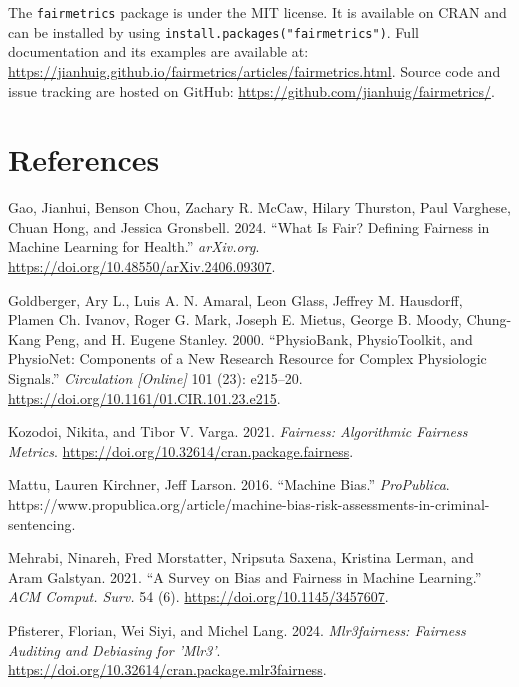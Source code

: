 \documentclass[10pt,a4paper,onecolumn]{article}
\newlength{\cslhangindent}
\newenvironment{CSLReferences}[2] %
 {\begin{list}{}{%
  \setlength{\itemindent}{0pt}
  \setlength{\leftmargin}{0pt}
  \setlength{\parsep}{0pt}
  \ifodd #1
   \setlength{\leftmargin}{\cslhangindent}
   \setlength{\itemindent}{-1\cslhangindent}
  \fi
  \setlength{\itemsep}{#2\baselineskip}}}
 {\end{list}}
\begin{document}
The \texttt{fairmetrics} package is under the MIT license. It is
available on CRAN and can be installed by using
\texttt{install.packages("fairmetrics")}. Full documentation and its
examples are available at:
\url{https://jianhuig.github.io/fairmetrics/articles/fairmetrics.html}.
Source code and issue tracking are hosted on GitHub:
\url{https://github.com/jianhuig/fairmetrics/}.

\section*{References}\label{references}

\label{refs}
\begin{CSLReferences}{1}{0}
Gao, Jianhui, Benson Chou, Zachary R. McCaw, Hilary Thurston, Paul
Varghese, Chuan Hong, and Jessica Gronsbell. 2024. {``What Is Fair?
Defining Fairness in Machine Learning for Health.''} \emph{arXiv.org}.
\url{https://doi.org/10.48550/arXiv.2406.09307}.

Goldberger, Ary L., Luis A. N. Amaral, Leon Glass, Jeffrey M. Hausdorff,
Plamen Ch. Ivanov, Roger G. Mark, Joseph E. Mietus, George B. Moody,
Chung-Kang Peng, and H. Eugene Stanley. 2000. {``PhysioBank,
PhysioToolkit, and PhysioNet: Components of a New Research Resource for
Complex Physiologic Signals.''} \emph{Circulation {[}Online{]}} 101
(23): e215--20. \url{https://doi.org/10.1161/01.CIR.101.23.e215}.

Kozodoi, Nikita, and Tibor V. Varga. 2021. \emph{Fairness: Algorithmic
Fairness Metrics}. \url{https://doi.org/10.32614/cran.package.fairness}.

Mattu, Lauren Kirchner, Jeff Larson. 2016. {``Machine {Bias}.''}
\emph{ProPublica}.
https://www.propublica.org/article/machine-bias-risk-assessments-in-criminal-sentencing.

Mehrabi, Ninareh, Fred Morstatter, Nripsuta Saxena, Kristina Lerman, and
Aram Galstyan. 2021. {``A Survey on Bias and Fairness in Machine
Learning.''} \emph{ACM Comput. Surv.} 54 (6).
\url{https://doi.org/10.1145/3457607}.

Pfisterer, Florian, Wei Siyi, and Michel Lang. 2024. \emph{Mlr3fairness:
Fairness Auditing and Debiasing for 'Mlr3'}.
\url{https://doi.org/10.32614/cran.package.mlr3fairness}.


\end{CSLReferences}
\end{document}
